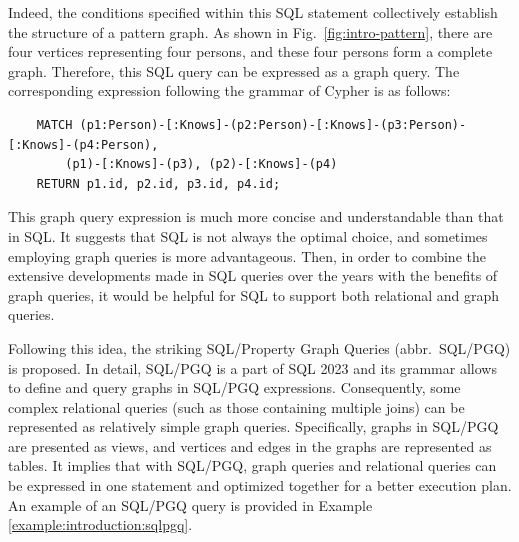 Indeed, the conditions specified within this SQL statement collectively establish the structure of a pattern graph.
As shown in Fig.~\ref{fig:intro-pattern}, there are four vertices representing four persons, and these four persons form a complete graph.
Therefore, this SQL query can be expressed as a graph query.
The corresponding expression following the grammar of Cypher is as follows: 
\begin{lstlisting}
    MATCH (p1:Person)-[:Knows]-(p2:Person)-[:Knows]-(p3:Person)-[:Knows]-(p4:Person),
        (p1)-[:Knows]-(p3), (p2)-[:Knows]-(p4)
    RETURN p1.id, p2.id, p3.id, p4.id;
\end{lstlisting} 
This graph query expression is much more concise and understandable than that in SQL.
It suggests that SQL is not always the optimal choice, and sometimes employing graph queries is more advantageous.
Then, in order to combine the extensive developments made in SQL queries over the years with the benefits of graph queries, it would be helpful for SQL to support both relational and graph queries.

Following this idea, the striking SQL/Property Graph Queries (abbr.~SQL/PGQ) is proposed.
In detail, SQL/PGQ is a part of SQL 2023 and its grammar allows to define and query graphs in SQL/PGQ expressions.
Consequently, some complex relational queries (such as those containing multiple joins) can be represented as relatively simple graph queries.
Specifically, graphs in SQL/PGQ are presented as views, and vertices and edges in the graphs are represented as tables.
It implies that with SQL/PGQ, graph queries and relational queries can be expressed in one statement and optimized together for a better execution plan.
An example of an SQL/PGQ query is provided in Example \ref{example:introduction:sqlpgq}.


